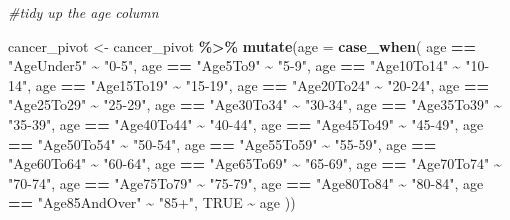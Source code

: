 \documentclass[
]{article}
\newenvironment{Shaded}{\begin{snugshade}}{\end{snugshade}}
\newcommand{\AttributeTok}[1]{\textcolor[rgb]{0.13,0.29,0.53}{#1}}
\newcommand{\CommentTok}[1]{\textcolor[rgb]{0.56,0.35,0.01}{\textit{#1}}}
\newcommand{\ConstantTok}[1]{\textcolor[rgb]{0.56,0.35,0.01}{#1}}
\newcommand{\FunctionTok}[1]{\textcolor[rgb]{0.13,0.29,0.53}{\textbf{#1}}}
\newcommand{\NormalTok}[1]{#1}
\newcommand{\OtherTok}[1]{\textcolor[rgb]{0.56,0.35,0.01}{#1}}
\newcommand{\SpecialCharTok}[1]{\textcolor[rgb]{0.81,0.36,0.00}{\textbf{#1}}}
\newcommand{\StringTok}[1]{\textcolor[rgb]{0.31,0.60,0.02}{#1}}
\begin{document}
\begin{Shaded}
\begin{Highlighting}[]
\CommentTok{\#tidy up the age column}

\NormalTok{cancer\_pivot }\OtherTok{\textless{}{-}}\NormalTok{ cancer\_pivot }\SpecialCharTok{\%\textgreater{}\%} 
  \FunctionTok{mutate}\NormalTok{(}\AttributeTok{age =} \FunctionTok{case\_when}\NormalTok{(}
\NormalTok{    age }\SpecialCharTok{==} \StringTok{"AgeUnder5"} \SpecialCharTok{\textasciitilde{}} \StringTok{"0{-}5"}\NormalTok{,}
\NormalTok{    age }\SpecialCharTok{==} \StringTok{"Age5To9"} \SpecialCharTok{\textasciitilde{}} \StringTok{"5{-}9"}\NormalTok{,}
\NormalTok{    age }\SpecialCharTok{==} \StringTok{"Age10To14"} \SpecialCharTok{\textasciitilde{}} \StringTok{"10{-}14"}\NormalTok{,}
\NormalTok{    age }\SpecialCharTok{==} \StringTok{"Age15To19"} \SpecialCharTok{\textasciitilde{}} \StringTok{"15{-}19"}\NormalTok{, }
\NormalTok{    age }\SpecialCharTok{==} \StringTok{"Age20To24"} \SpecialCharTok{\textasciitilde{}} \StringTok{"20{-}24"}\NormalTok{,}
\NormalTok{    age }\SpecialCharTok{==} \StringTok{"Age25To29"} \SpecialCharTok{\textasciitilde{}} \StringTok{"25{-}29"}\NormalTok{,}
\NormalTok{    age }\SpecialCharTok{==} \StringTok{"Age30To34"} \SpecialCharTok{\textasciitilde{}} \StringTok{"30{-}34"}\NormalTok{,}
\NormalTok{    age }\SpecialCharTok{==} \StringTok{"Age35To39"} \SpecialCharTok{\textasciitilde{}} \StringTok{"35{-}39"}\NormalTok{,               }
\NormalTok{    age }\SpecialCharTok{==} \StringTok{"Age40To44"} \SpecialCharTok{\textasciitilde{}} \StringTok{"40{-}44"}\NormalTok{,       }
\NormalTok{    age }\SpecialCharTok{==} \StringTok{"Age45To49"} \SpecialCharTok{\textasciitilde{}} \StringTok{"45{-}49"}\NormalTok{,}
\NormalTok{    age }\SpecialCharTok{==} \StringTok{"Age50To54"} \SpecialCharTok{\textasciitilde{}} \StringTok{"50{-}54"}\NormalTok{,               }
\NormalTok{      age }\SpecialCharTok{==} \StringTok{"Age55To59"} \SpecialCharTok{\textasciitilde{}} \StringTok{"55{-}59"}\NormalTok{,}
\NormalTok{    age }\SpecialCharTok{==} \StringTok{"Age60To64"} \SpecialCharTok{\textasciitilde{}} \StringTok{"60{-}64"}\NormalTok{,}
\NormalTok{    age }\SpecialCharTok{==} \StringTok{"Age65To69"} \SpecialCharTok{\textasciitilde{}} \StringTok{"65{-}69"}\NormalTok{,}
\NormalTok{    age }\SpecialCharTok{==} \StringTok{"Age70To74"} \SpecialCharTok{\textasciitilde{}} \StringTok{"70{-}74"}\NormalTok{,}
\NormalTok{    age }\SpecialCharTok{==} \StringTok{"Age75To79"} \SpecialCharTok{\textasciitilde{}} \StringTok{"75{-}79"}\NormalTok{,}
\NormalTok{    age }\SpecialCharTok{==} \StringTok{"Age80To84"} \SpecialCharTok{\textasciitilde{}} \StringTok{"80{-}84"}\NormalTok{,}
\NormalTok{    age }\SpecialCharTok{==} \StringTok{"Age85AndOver"} \SpecialCharTok{\textasciitilde{}} \StringTok{"85+"}\NormalTok{,}
    \ConstantTok{TRUE} \SpecialCharTok{\textasciitilde{}}\NormalTok{ age}
\NormalTok{    ))}
\end{Highlighting}
\end{Shaded}
\end{document}
